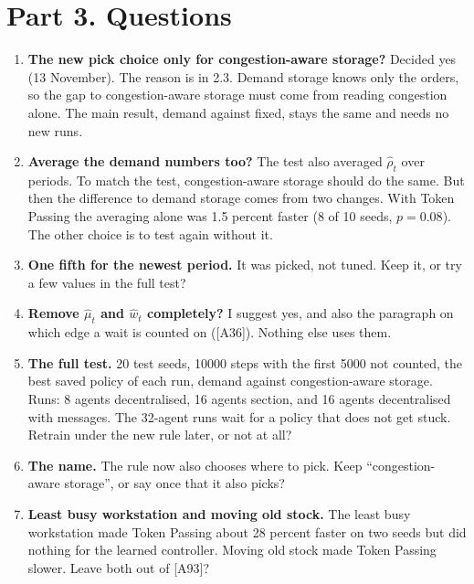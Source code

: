 \documentclass[11pt,a4paper]{article}
\begin{document}
\section*{Part 3. Questions}
\begin{enumerate}[leftmargin=1.4em]
\item \textbf{The new pick choice only for congestion-aware storage?} Decided yes
  (13 November). The reason is in 2.3. Demand storage knows only the orders, so the
  gap to congestion-aware storage must come from reading congestion alone. The main
  result, demand against fixed, stays the same and needs no new runs.
\item \textbf{Average the demand numbers too?} The test also averaged
  $\hat\rho_t$ over periods. To match the test, congestion-aware storage should do
  the same. But then the difference to demand storage comes from two changes. With
  Token Passing the averaging alone was 1.5 percent faster (8 of 10 seeds,
  $p = 0.08$). The other choice is to test again without it.
\item \textbf{One fifth for the newest period.} It was picked, not tuned. Keep it,
  or try a few values in the full test?
\item \textbf{Remove $\hat\mu_t$ and $\hat w_t$ completely?} I suggest yes, and also
  the paragraph on which edge a wait is counted on ([A36]). Nothing else uses them.
\item \textbf{The full test.} 20 test seeds, 10000 steps with the first 5000 not
  counted, the best saved policy of each run, demand against congestion-aware
  storage. Runs: 8 agents decentralised, 16 agents section, and 16 agents
  decentralised with messages. The 32-agent runs wait for a policy that does not
  get stuck. Retrain under the new rule later, or not at all?
\item \textbf{The name.} The rule now also chooses where to pick. Keep
  ``congestion-aware storage'', or say once that it also picks?
\item \textbf{Least busy workstation and moving old stock.} The least busy
  workstation made Token Passing about 28 percent faster on two seeds but did
  nothing for the learned controller. Moving old stock made Token Passing slower.
  Leave both out of [A93]?
\end{enumerate}
\end{document}
